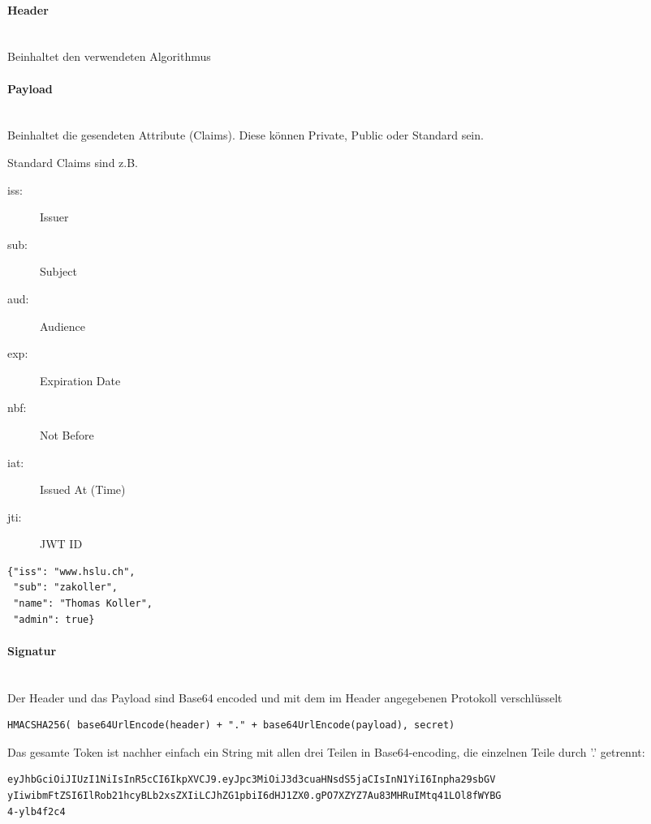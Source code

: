 \documentclass[a4paper, 11pt]{article}
\begin{document}
\paragraph{Header}\mbox{}\\
Beinhaltet den verwendeten Algorithmus

\paragraph{Payload}\mbox{}\\
Beinhaltet die gesendeten Attribute (Claims). Diese können Private, Public oder Standard sein.

Standard Claims sind z.B.

\begin{multicols}{2}
	\begin{description}
		\item[iss: ] Issuer
		\item[sub: ] Subject
		\item[aud: ] Audience
		\item[exp: ] Expiration Date
		\item[nbf: ] Not Before
		\item[iat: ] Issued At (Time)
		\item[jti: ] JWT ID
	\end{description}
\end{multicols}

\begin{lstlisting}
{"iss": "www.hslu.ch",
 "sub": "zakoller",
 "name": "Thomas Koller",
 "admin": true}
\end{lstlisting}

\paragraph{Signatur}\mbox{}\\
Der Header und das Payload sind Base64 encoded und mit dem im Header angegebenen Protokoll verschlüsselt
\begin{lstlisting}
HMACSHA256( base64UrlEncode(header) + "." + base64UrlEncode(payload), secret)
\end{lstlisting}

\vspace{10px}

\noindent Das gesamte Token ist nachher einfach ein String mit allen drei Teilen in Base64-encoding, die einzelnen Teile durch '.' getrennt:
\begin{lstlisting}
eyJhbGciOiJIUzI1NiIsInR5cCI6IkpXVCJ9.eyJpc3MiOiJ3d3cuaHNsdS5jaCIsInN1YiI6Inpha29sbGV
yIiwibmFtZSI6IlRob21hcyBLb2xsZXIiLCJhZG1pbiI6dHJ1ZX0.gPO7XZYZ7Au83MHRuIMtq41LOl8fWYBG
4-ylb4f2c4
\end{lstlisting}
\end{document}
